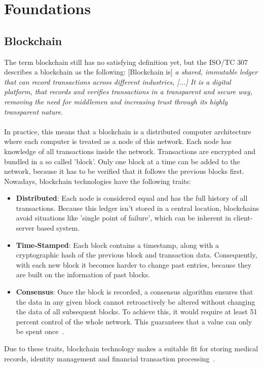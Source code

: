 \section{Foundations} \label{sec:foundations}

\subsection{Blockchain}
The term blockchain still has no satisfying definition yet, but the ISO/TC 307 describes a blockchain as the following:
[Blockchain is] \textit{a shared, immutable ledger that can record transactions across different industries, [...]  It is a digital platform, that records and verifies transactions in a transparent and secure way, removing the need for middlemen and increasing trust through its highly transparent nature}.
\\
\\
In practice, this means that a blockchain is a distributed computer architecture where each computer is treated as a node of this network. Each node has knowledge of all transactions inside the network. Transactions are encrypted and bundled in a so called 'block'. Only one block at a time can be added to the network, because it has to be verified that it follows the previous blocks first. Nowadays, blockchain technologies have the following traits:
\begin{itemize}
\item \textbf{Distributed}: Each node is considered equal and has the full history of all transactions.
Because this ledger isn't stored in a central location, blockchains avoid situations like 'single point of failure', which can be inherent in client-server based system.
\item \textbf{Time-Stamped}: Each block contains a timestamp, along with a cryptographic hash of the previous block and transaction data. Consequently, with each new block it becomes harder to change past entries, because they are built on the information of past blocks.
\item \textbf{Consensus}: Once the block is recorded, a consensus algorithm ensures that the data in any given block cannot retroactively be altered without changing the data of all subsequent blocks. To achieve this, it would require at least 51 percent control of the whole network. This guarantees that a value can only be spent once~\cite{Blockchain}.
\end{itemize}


Due to these traits, blockchain technology makes a suitable fit for storing  medical records, identity management and financial transaction processing~\cite{Application}.

